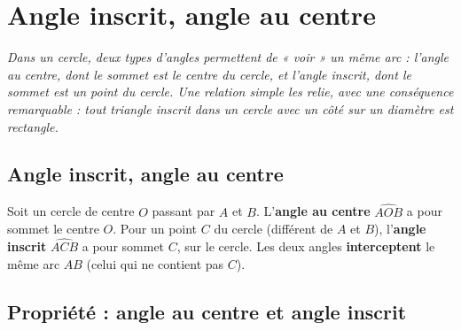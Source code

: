 \chapter{Angle inscrit, angle au centre}

\noindent\textit{Dans un cercle, deux types d'angles permettent de « voir » un même arc :
l'angle au centre, dont le sommet est le centre du cercle, et l'angle inscrit, dont le
sommet est un point du cercle. Une relation simple les relie, avec une conséquence
remarquable : tout triangle inscrit dans un cercle avec un côté sur un diamètre est
rectangle.}
\vspace{8pt}

\connecteBanner

\section{Angle inscrit, angle au centre}

\begin{definition}
Soit un cercle de centre $O$ passant par $A$ et $B$. L'\textbf{angle au centre} $\widehat{AOB}$
a pour sommet le centre $O$. Pour un point $C$ du cercle (différent de $A$ et $B$),
l'\textbf{angle inscrit} $\widehat{ACB}$ a pour sommet $C$, sur le cercle. Les deux angles
\textbf{interceptent} le même arc $AB$ (celui qui ne contient pas $C$).
\end{definition}

\begin{illus}
\end{illus}

\section{Propriété : angle au centre et angle inscrit}

